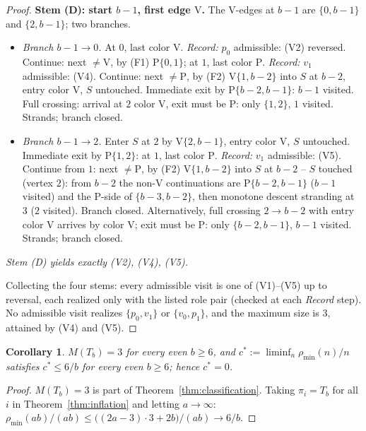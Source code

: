 \documentclass[11pt]{article}
\newtheorem{corollary}[theorem]{Corollary}
\theoremstyle{definition}
\newcommand{\pmin}{\rho_{\min}}
\begin{document}
\begin{proof}
\medskip
\noindent\textbf{Stem (D): start $b-1$, first edge $\mathrm V$.}
The V-edges at $b-1$ are $\{0, b-1\}$ and $\{2, b-1\}$; two branches.
\begin{itemize}
\item \emph{Branch $b-1 \to 0$.} At $0$, last color $\mathrm V$. \emph{Record:} $p_0$
admissible: (V2) reversed. Continue: next $\ne \mathrm V$, by (F1) $\mathrm P\{0,1\}$;
at $1$, last color $\mathrm P$. \emph{Record:} $v_1$ admissible: (V4). Continue: next
$\ne \mathrm P$, by (F2) $\mathrm V\{1,b-2\}$ into $S$ at $b-2$, entry color $\mathrm V$,
$S$ untouched. Immediate exit by $\mathrm P\{b-2,b-1\}$: $b-1$ visited. Full crossing:
arrival at $2$ color $\mathrm V$, exit must be $\mathrm P$: only $\{1,2\}$, $1$ visited.
Strands; branch closed.
\item \emph{Branch $b-1 \to 2$.} Enter $S$ at $2$ by $\mathrm V\{2,b-1\}$, entry color
$\mathrm V$, $S$ untouched. Immediate exit by $\mathrm P\{1,2\}$: at $1$, last color
$\mathrm P$. \emph{Record:} $v_1$ admissible: (V5). Continue from $1$: next
$\ne \mathrm P$, by (F2) $\mathrm V\{1,b-2\}$ into $S$ at $b-2$ -- $S$ touched (vertex
$2$): from $b-2$ the non-$\mathrm V$ continuations are $\mathrm P\{b-2,b-1\}$ ($b-1$
visited) and the P-side of $\{b-3,b-2\}$, then monotone descent stranding at $3$ ($2$
visited). Branch closed. Alternatively, full crossing $2 \to b-2$ with entry color
$\mathrm V$ arrives by color $\mathrm V$; exit must be $\mathrm P$: only $\{b-2,b-1\}$,
$b-1$ visited. Strands; branch closed.
\end{itemize}
\emph{Stem (D) yields exactly (V2), (V4), (V5).}

\medskip
Collecting the four stems: every admissible visit is one of (V1)--(V5) up to reversal,
each realized only with the listed role pair (checked at each \emph{Record} step). No
admissible visit realizes $\{p_0, v_1\}$ or $\{v_0, p_1\}$, and the maximum size is
$3$, attained by (V4) and (V5).
\end{proof}

\begin{corollary}\label{cor:M3}
$M(T_b) = 3$ for every even $b \ge 6$, and $c^* := \liminf_n \pmin(n)/n$ satisfies
$c^* \le 6/b$ for every even $b \ge 6$; hence $c^* = 0$.
\end{corollary}

\begin{proof}
$M(T_b) = 3$ is part of Theorem~\ref{thm:classification}. Taking $\pi_i = T_b$ for all
$i$ in Theorem~\ref{thm:inflation} and letting $a \to \infty$:
$\pmin(ab)/(ab) \le \bigl((2a-3)\cdot 3 + 2b\bigr)/(ab) \to 6/b$.
\end{proof}
\end{document}
